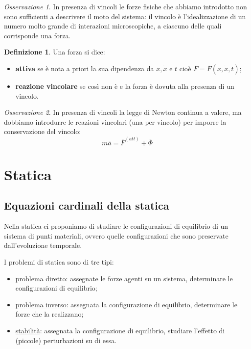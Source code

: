 \documentclass{book}
\theoremstyle{plain}
\theoremstyle{plain}
\theoremstyle{plain}
\theoremstyle{plain}
\theoremstyle{plain}
\theoremstyle{definition}
\newtheorem{defi}{Definizione}[chapter]
\theoremstyle{remark}
\newtheorem*{oss}{Osservazione}
\theoremstyle{definition}
\begin{document}
\begin{oss}
    In presenza di vincoli le forze fisiche che abbiamo introdotto non sono sufficienti a descrivere il moto del sistema: il vincolo è l'idealizzazione di un numero molto grande di interazioni microscopiche, a ciascuno delle quali corrisponde una forza.
\end{oss}

\begin{defi}
    Una forza si dice:
    \begin{itemize}
        \item \textbf{attiva} se è nota a priori la sua dipendenza da $\overline{x}, \dot{\overline{x}}$ e $t$ cioè $\overline{F}=\overline{F}(\overline{x}, \dot{\overline{x}}, t)$;
        \item \textbf{reazione vincolare} se così non è e la forza è dovuta alla presenza di un vincolo.
    \end{itemize}
\end{defi}

\begin{oss}
    In presenza di vincoli la legge di Newton continua a valere, ma dobbiamo introdurre le reazioni vincolari (una per vincolo) per imporre la conservazione del vincolo:
    \begin{displaymath}
    \boxed{
         m\overline{a}=\overline{F}^{(att)}+\overline{\Phi}
         }
    \end{displaymath}
\end{oss}

\chapter{Statica}

\section{Equazioni cardinali della statica}

Nella statica ci proponiamo di studiare le configurazioni di equilibrio di un sistema di punti materiali, ovvero quelle configurazioni che sono preservate dall'evoluzione temporale.

\noindent I problemi di statica sono di tre tipi:
\begin{itemize}
    \item \underline{problema diretto}: assegnate le forze agenti su un sistema, determinare le configurazioni di equilibrio;
    \item \underline{problema inverso}: assegnata la configurazione di equilibrio, determinare le forze che la realizzano;
    \item \underline{stabilità}: assegnata la configurazione di equilibrio, studiare l'effetto di (piccole) perturbazioni su di essa.
\end{itemize}
\end{document}
